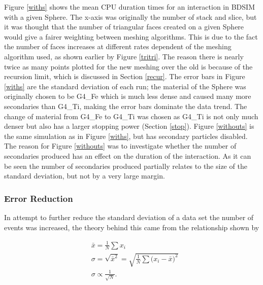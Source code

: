 \documentclass[12pt,a4paper]{article}
\begin{document}
\noindent Figure \ref{withs} shows the mean CPU duration times for an interaction in BDSIM with a given Sphere. The x-axis was originally the number of stack and slice, but it was thought that the number of triangular faces created on a given Sphere would give a fairer weighting between meshing algorithms. This is due to the fact the number of faces increases at different rates dependent of the meshing algorithm used, as shown earlier by Figure \ref{tritri}. The reason there is nearly twice as many points plotted for the new meshing over the old is because of the recursion limit, which is discussed in Section \ref{recur}. The error bars in Figure \ref{withs} are the standard deviation of each run; the material of the Sphere was originally chosen to be G4\_Fe which is much less dense and caused many more secondaries than G4\_Ti, making the error bars dominate the data trend. The change of material from G4\_Fe to G4\_Ti was chosen as G4\_Ti is not only much denser but also has a larger stopping power (Section \ref{stop}). Figure \ref{withouts} is the same simulation as in Figure \ref{withs}, but has secondary particles disabled. The reason for Figure \ref{withouts} was to investigate whether the number of secondaries produced has an effect on the duration of the interaction. As it can be seen the number of secondaries produced partially relates to the size of the standard deviation, but not by a very large margin.

\newpage
\subsubsection{Error Reduction}
\label{err}
\noindent In attempt to further reduce the standard deviation of a data set the number of events was increased, the theory behind this came from the relationship shown by %

\begin{equation}
\begin{aligned}
& \bar{x} = \frac{1}{N}\sum{x_i}\\
& \sigma = \sqrt{\bar{x}^2} = \sqrt{\frac{1}{N}\sum{(x_i - \bar{x}})^2}\\
& \sigma \propto \frac{1}{\sqrt{N}} .
\end{aligned}
\label{a}
\end{equation}
\end{document}
